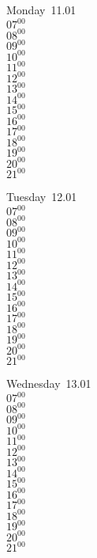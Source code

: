 \documentclass[11pt,a4paper]{book}\usepackage[]{graphicx}\usepackage[]{color}
\begin{document}
\begin{headerbox}
\end{headerbox}
\begin{weekdaybox}
  Monday~11.01\\
  { 
  \vfill
  $07^{00}$\\
$08^{00}$\\
$09^{00}$\\
$10^{00}$\\
$11^{00}$\\
$12^{00}$\\
$13^{00}$\\
$14^{00}$\\
$15^{00}$\\
$16^{00}$\\
$17^{00}$\\
$18^{00}$\\
$19^{00}$\\
$20^{00}$\\
$21^{00}$\\
  }
\end{weekdaybox}
\begin{weekdaybox}
  Tuesday~12.01\\
  { 
  \vfill
  $07^{00}$\\
$08^{00}$\\
$09^{00}$\\
$10^{00}$\\
$11^{00}$\\
$12^{00}$\\
$13^{00}$\\
$14^{00}$\\
$15^{00}$\\
$16^{00}$\\
$17^{00}$\\
$18^{00}$\\
$19^{00}$\\
$20^{00}$\\
$21^{00}$\\
  }
\end{weekdaybox}
\begin{weekdaybox}
  Wednesday~13.01\\
  { 
  \vfill
  $07^{00}$\\
$08^{00}$\\
$09^{00}$\\
$10^{00}$\\
$11^{00}$\\
$12^{00}$\\
$13^{00}$\\
$14^{00}$\\
$15^{00}$\\
$16^{00}$\\
$17^{00}$\\
$18^{00}$\\
$19^{00}$\\
$20^{00}$\\
$21^{00}$\\
  }
\end{weekdaybox}
\end{document}
